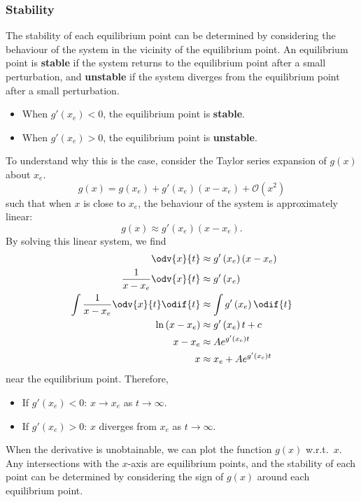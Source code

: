 \documentclass{article}
\begin{document}
\subsubsection{Stability}
The stability of each equilibrium point can be determined by considering the behaviour of the system in the vicinity of the equilibrium point.
An equilibrium point is \textbf{stable} if the system returns to the equilibrium point after a small perturbation,
and \textbf{unstable} if the system diverges from the equilibrium point after a small perturbation.
\begin{itemize}
    \item When \(g'\left( x_e \right) < 0\), the equilibrium point is \textbf{stable}.
    \item When \(g'\left( x_e \right) > 0\), the equilibrium point is \textbf{unstable}.
\end{itemize}
To understand why this is the case, consider the Taylor series expansion of \(g\left( x \right)\) about \(x_e\).
\begin{equation*}
    g\left( x \right) = g\left( x_e \right) + g'\left( x_e \right) \left( x - x_e \right) + \mathcal{O}\left( x^2 \right)
\end{equation*}
such that when \(x\) is close to \(x_e\), the behaviour of the system is approximately linear:
\begin{equation*}
    g\left( x \right) \approx g'\left( x_e \right) \left( x - x_e \right).
\end{equation*}
By solving this linear system, we find
\begin{align*}
    \odv{x}{t}                                 & \approx g'\left( x_e \right) \left( x - x_e \right) \\
    \frac{1}{x - x_e} \odv{x}{t}               & \approx g'\left( x_e \right)                        \\
    \int \frac{1}{x - x_e} \odv{x}{t} \odif{t} & \approx \int g'\left( x_e \right) \odif{t}          \\
    \ln{\left( x - x_e \right)}                & \approx g'\left( x_e \right) t + c                  \\
    x - x_e                                    & \approx A e^{g'\left( x_e \right) t}                \\
    x                                          & \approx x_e + A e^{g'\left( x_e \right) t}
\end{align*}
near the equilibrium point. Therefore,
\begin{itemize}
    \item If \(g'\left( x_e \right) < 0\): \(x \to x_e\) as \(t \to \infty\).
    \item If \(g'\left( x_e \right) > 0\): \(x\) diverges from \(x_e\) as \(t \to \infty\).
\end{itemize}
When the derivative is unobtainable, we can plot the function \(g\left( x \right)\) w.r.t.\ \(x\).
Any intersections with the \(x\)-axis are equilibrium points, and the stability of each point can be determined by considering the sign of \(g\left( x \right)\) around each equilibrium point.
\end{document}
